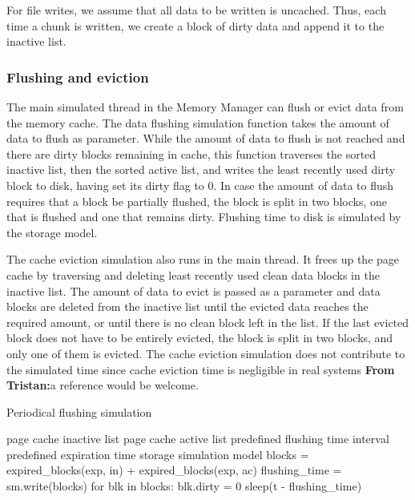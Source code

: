 \documentclass[conference]{IEEEtran}
\newcommand{\Desc}[2]{\State \makebox[2em][l]{#1}#2}
\newcommand{\tristan}[1]{\color{orange}\textbf{From Tristan:}#1\color{black}}
\begin{document}
    For file writes, we assume that all data to be written is 
    uncached. Thus, each time a chunk is written, we create a block of dirty data 
    and append it to the inactive list.

    \subsubsection{Flushing and eviction}

    The main simulated thread in the Memory Manager can flush or evict data from the
    memory cache. The data flushing simulation
    function takes the amount of data to flush as parameter. While
    the amount of data to flush is not reached and there are dirty
    blocks remaining in cache, this function traverses the sorted
    inactive list, then the sorted active list, and writes the
    least recently used dirty block to disk, having set its dirty
    flag to 0. In case the amount of data to flush requires that a
    block be partially flushed, the block is split in two blocks,
    one that is flushed and one that remains dirty. Flushing time
    to disk is simulated by the storage model.

    The cache eviction simulation also runs in
    the main thread. It frees up the page cache by traversing and deleting 
    least recently used clean data blocks in the inactive list.
    The amount of data to evict is passed as a parameter and data blocks are deleted 
    from the inactive list until the evicted data reaches the required amount,
    or until there is no clean block left in the list.
    If the last evicted block does not have to be entirely evicted, the block is split in two blocks,
    and only one of them is evicted.
    The cache eviction simulation does not contribute to the simulated time 
    since cache eviction time is negligible in real systems \tristan{a reference would be welcome}.
    
    \begin{algorithm}\caption{Periodical flushing simulation}\label{alg:pdflush}
        \small
        \begin{algorithmic}[1]
            \Input
                \Desc{in}{page cache inactive list}
                \Desc{ac}{page cache active list}
                \Desc{t}{predefined flushing time interval}
                \Desc{exp}{predefined expiration time}
                \Desc{sm}{storage simulation model}
               \EndInput
                \State blocks = expired\_blocks(exp, in) + expired\_blocks(exp, ac) 
                \State flushing\_time = sm.write(blocks)
                \State for blk in blocks: blk.dirty = 0
                    \State sleep(t - flushing\_time)
                \EndIf  %
            \EndWhile
        \end{algorithmic}
    \end{algorithm}
\end{document}
